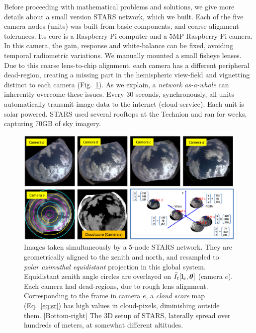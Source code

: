\documentclass[runningheads]{llncs}
\begin{document}
Before proceeding with mathematical problems and solutions, we give more details about a small version STARS network, which we built. Each of the five camera nodes (units) was built from basic components, and coarse alignment tolerances. Its core is a Raspberry-Pi computer and a 5MP Raspberry-Pi camera. In this camera, the gain, response and white-balance can be fixed, avoiding temporal radiometric variations. We manually mounted a small fisheye lenses. Due to this coarse lens-to-chip alignment, each camera has a different peripheral dead-region, creating a missing part in the hemispheric view-field and vignetting distinct to each camera (Fig.~\ref{fig:photomotion}). As we explain, a {\em {\em network} as-a-whole} can inherently overcome these issues. Every 30 seconds, synchronously, all units automatically transmit image data to the internet (cloud-service). Each unit is solar powered.
STARS used several rooftops at the Technion and ran for weeks, capturing 70GB of sky imagery.
\begin{figure}[t!]
\begin{center}
   \includegraphics[width=1\linewidth]{figures/scene_d.eps}
\end{center}
   \vspace{-1.2cm}
   \caption{Images taken simultaneously by a 5-node STARS network. They are geometrically aligned to the zenith and north, and resampled to {\em polar azimuthal equidistant} projection in this global system. Equidistant zenith angle circles are overlayed on $\tilde I_t[{\bf l}_e,{\bm \theta}]$ (camera $e$). Each camera had dead-regions, due to rough lens alignment.
   Corresponding to the frame in camera $e$, a {\em cloud score} map (Eq.~\ref{eq:sr}) has high values in cloud-pixels, diminishing outside them. [Bottom-right] The 3D setup of STARS, laterally spread over hundreds of meters, at somewhat different altitudes.}
\label{fig:photomotion}
\end{figure}
\end{document}
